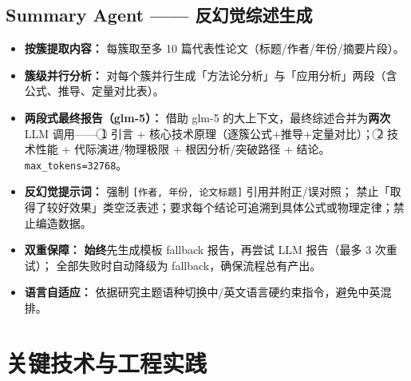 \documentclass[10pt,a4paper]{article}
\begin{document}
\subsection{Summary Agent —— 反幻觉综述生成}
\begin{itemize}[leftmargin=2.2em,itemsep=0.08em]
  \item \textbf{按簇提取内容：} 每簇取至多 10 篇代表性论文（标题/作者/年份/摘要片段）。
  \item \textbf{簇级并行分析：} 对每个簇并行生成「方法论分析」与「应用分析」两段（含公式、推导、定量对比表）。
  \item \textbf{两段式最终报告（glm-5）：} 借助 glm-5 的大上下文，最终综述合并为\textbf{两次} LLM 调用——
        \textcircled{1} 引言 + 核心技术原理（逐簇公式+推导+定量对比）；
        \textcircled{2} 技术性能 + 代际演进/物理极限 + 根因分析/突破路径 + 结论。\texttt{max\_tokens=32768}。
  \item \textbf{反幻觉提示词：} 强制 \texttt{[作者, 年份, 论文标题]} 引用并附正/误对照；
        禁止「取得了较好效果」类空泛表述；要求每个结论可追溯到具体公式或物理定律；禁止编造数据。
  \item \textbf{双重保障：} \textbf{始终}先生成模板 fallback 报告，再尝试 LLM 报告（最多 3 次重试）；
        全部失败时自动降级为 fallback，确保流程总有产出。
  \item \textbf{语言自适应：} 依据研究主题语种切换中/英文语言硬约束指令，避免中英混排。
\end{itemize}

\section{关键技术与工程实践}
\end{document}
